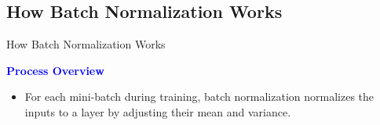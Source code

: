 \documentclass[serif, aspectratio=169]{beamer}
\begin{document}
%	
%	
%	
%	
%
%	
%	
%	
%	

\subsection{How Batch Normalization Works}

\begin{frame}{How Batch Normalization Works}

    \textcolor{blue}{\textbf{Process Overview}}
    
    \begin{itemize}

        \item  For each mini-batch during training, batch normalization normalizes the inputs to a layer by adjusting their mean and variance.

    \end{itemize}
\end{frame}
\end{document}
